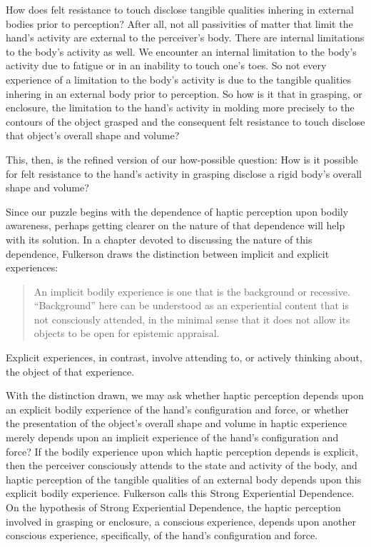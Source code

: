 \documentclass[12pt]{article}
\begin{document}
How does felt resistance to touch disclose tangible qualities inhering in external bodies prior to perception? After all, not all passivities of matter that limit the hand's activity are external to the perceiver's body. There are internal limitations to the body's activity as well. We encounter an internal limitation to the body's activity due to fatigue or in an inability to touch one's toes. So not every experience of a limitation to the body's activity is due to the tangible qualities inhering in an external body prior to perception. So how is it that in grasping, or enclosure, the limitation to the hand's activity in molding more precisely to the contours of the object grasped and the consequent felt resistance to touch disclose that object's overall shape and volume? 

This, then, is the refined version of our how-possible question: How is it possible for felt resistance to the hand's activity in grasping disclose a rigid body's overall shape and volume? 

Since our puzzle begins with the dependence of haptic perception upon bodily awareness, perhaps getting clearer on the nature of that dependence will help with its solution. In a chapter devoted to discussing the nature of this dependence, Fulkerson draws the distinction between implicit and explicit experiences:
\begin{quote}
	An implicit bodily experience is one that is the background or recessive. ``Background'' here can be understood as an experiential content that is not consciously attended, in the minimal sense that it does not allow its objects to be open for epistemic appraisal. 
\end{quote}
Explicit experiences, in contrast, involve attending to, or actively thinking about, the object of that experience. 

With the distinction drawn, we may ask whether haptic perception depends upon an explicit bodily experience of the hand's configuration and force, or whether the presentation of the object's overall shape and volume in haptic experience merely depends upon an implicit experience of the hand's configuration and force? If the bodily experience upon which haptic perception depends is explicit, then the perceiver consciously attends to the state and activity of the body, and haptic perception of the tangible qualities of an external body depends upon this explicit bodily experience. Fulkerson calls this Strong Experiential Dependence. On the hypothesis of Strong Experiential Dependence, the haptic perception involved in grasping or enclosure, a conscious experience, depends upon another conscious experience, specifically, of the hand's configuration and force.
\end{document}
